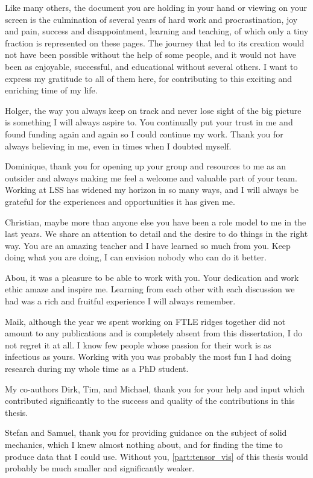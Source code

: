 %
Like many others, the document you are holding in your hand or viewing
on your screen is the culmination of several years of hard work and
procrastination, joy and pain, success and disappointment, learning and
teaching, of which only a tiny fraction is represented on these pages.
%
The journey that led to its creation would not have been possible without the
help of some people, and it would not have been as enjoyable, successful, and
educational without several others.
%
I want to express my gratitude to all of them here, for contributing to this
exciting and enriching time of my life.
%

%
Holger, the way you always keep on track and never lose sight of the big picture
is something I will always aspire to.
%
You continually put your trust in me and found funding again and again so I
could continue my work.
%
Thank you for always believing in me, even in times when I doubted myself.
%

%
Dominique, thank you for opening up your group and resources to me as an
outsider and always making me feel a welcome and valuable part of your team.
%
Working at LSS has widened my horizon in so many ways, and I will always be
grateful for the experiences and opportunities it has given me.
%

%
Christian, maybe more than anyone else you have been a role model to me in the
last years.
%
We share an attention to detail and the desire to do things in the right way.
%
You are an amazing teacher and I have learned so much from you.
%
Keep doing what you are doing, I can envision nobody who can do it better.
%

%
Abou, it was a pleasure to be able to work with you.
%
Your dedication and work ethic amaze and inspire me.
%
Learning from each other with each discussion we had was a rich and fruitful
experience I will always remember.
%

%
Maik, although the year we spent working on \acs{FTLE} ridges together did not
amount to any publications and is completely absent from this dissertation,
I do not regret it at all.
%
I know few people whose passion for their work is as infectious as yours.
%
Working with you was probably the most fun I had doing research during my whole
time as a PhD student.
%

%
My co-authors Dirk, Tim, and Michael, thank you for your help and input which
contributed significantly to the success and quality of the contributions in
this thesis.
%

%
Stefan and Samuel, thank you for providing guidance on the subject of solid
mechanics, which I knew almost nothing about, and for finding the time to
produce data that I could use.
%
Without you, \cref{part:tensor_vis} of this thesis would probably be much
smaller and significantly weaker.
%

